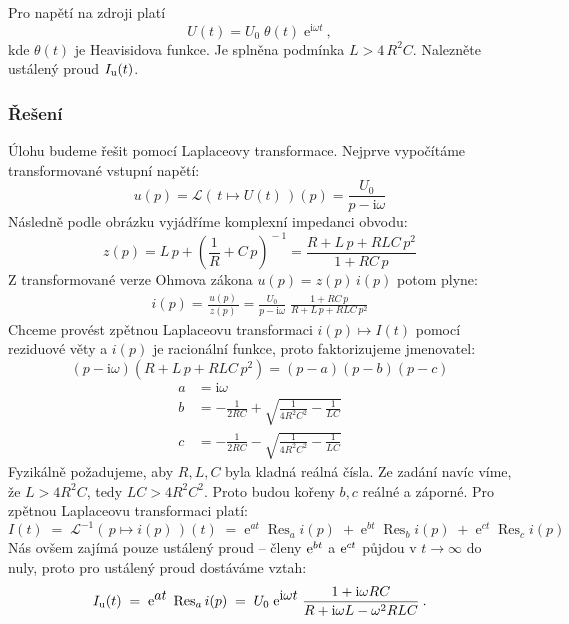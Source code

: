 \documentclass{article}
\def\L{\mathcal{L}}
\def\Res{\operatorname{Res}}
\newcommand{\e}[1]{\mathrm{e}^{\textstyle #1}}
\def\i{\mathrm{i}}
\begin{document}
\vspace{2em}

\noindent
Pro napětí na zdroji platí
\begin{equation*}
    U(t) = U_0 \; \theta(t) \; \e{\i \omega t} \: ,
\end{equation*}
kde $\theta(t)$ je Heavisidova funkce. Je splněna podmínka $L > 4 \, R^2 C$. Nalezněte ustálený proud $I_{\rm u}(t)$.

\subsubsection*{Řešení}
Úlohu budeme řešit pomocí Laplaceovy transformace. Nejprve vypočítáme transformované vstupní napětí:
\begin{equation*}
    u(p) = \L( \, t \mapsto U(t) \, )(p) = \frac{U_0}{p - \i \omega}
\end{equation*}
Následně podle obrázku vyjádříme komplexní impedanci obvodu:
\begin{equation*}
    z(p) = L \, p + \left( \frac{1}{R} + C \, p \right)^{\!-1}
    = \frac{R + L\,p + RLC \, p^2}{1 + RC \, p}
\end{equation*}
Z transformované verze Ohmova zákona $u(p) = z(p) \, i(p)$ potom plyne:
\begin{align*}
    i(p) = \frac{\, u(p) \,}{z(p)}
    = \frac{U_0}{p - \i \omega} \;
    \frac{1 + RC \, p}{R + L\,p + RLC \, p^2}
\end{align*}
Chceme provést zpětnou Laplaceovu transformaci $i(p) \mapsto I(t)$ pomocí reziduové věty a $i(p)$ je racionální funkce, proto faktorizujeme jmenovatel:
\begin{equation*}
    (p - \i\omega)(R + L \, p + RLC \, p^2)
    = (p - a)(p - b)(p - c)
\end{equation*}
\begin{align*}
    a &= \i\omega \\[8pt]
    b &= -\frac{1}{2RC} + \sqrt{\frac{1}{4 R^2 C^2} - \frac{1}{LC}} \\[8pt]
    c &= -\frac{1}{2RC} - \sqrt{\frac{1}{4 R^2 C^2} - \frac{1}{LC}}
\end{align*}
Fyzikálně požadujeme, aby $R,L,C$ byla kladná reálná čísla. Ze zadání navíc víme, že $L > 4 R^2 C$, tedy $LC > 4 R^2 C^2$. Proto budou kořeny $b,c$ reálné a záporné. Pro zpětnou Laplaceovu transformaci platí:
\begin{equation*}
    I(t) \;=\; \L^{-1}(\, p \mapsto i(p) \,)(t) \;=\;
    \e{at} \; \Res_a i(p) \;+\; \e{bt} \; \Res_b i(p) \;+\; \e{ct} \; \Res_c i(p)
\end{equation*}
Nás ovšem zajímá pouze ustálený proud – členy $\e{\scriptstyle bt}$ a $\e{\scriptstyle ct}$ půjdou v $t\to\infty$ do nuly, proto pro ustálený proud dostáváme vztah:
\begin{equation*}
    I_{\rm u}(t) \;=\;
    \e{at} \; \Res_a i(p) \;=\;
    U_0 \; \e{\i\omega t} \;
    \frac{1 + \i \omega RC}{R + \i \omega L - \omega^2 RLC}
    \: .
\end{equation*}
\end{document}

